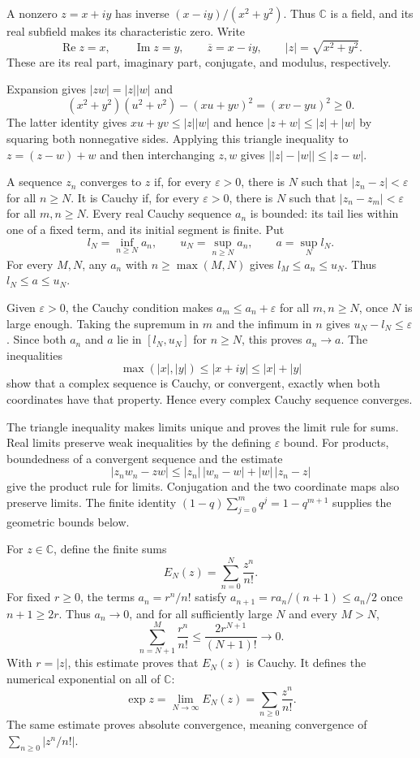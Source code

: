 A nonzero $z=x+iy$ has inverse $(x-iy)/(x^2+y^2)$.
Thus $\mathbb C$ is a field, and its real subfield makes its
characteristic zero.
Write
\[
 \operatorname{Re}z=x,\qquad \operatorname{Im}z=y,\qquad
 \overline z=x-iy,\qquad |z|=\sqrt{x^2+y^2}.
\]
These are its real part, imaginary part, conjugate, and modulus,
respectively.

Expansion gives $|zw|=|z||w|$ and
\[
 (x^2+y^2)(u^2+v^2)-(xu+yv)^2=(xv-yu)^2\geq0.
\]
The latter identity gives $xu+yv\leq|z||w|$ and hence
$|z+w|\leq|z|+|w|$ by squaring both nonnegative sides.
Applying this triangle inequality to $z=(z-w)+w$ and then interchanging
$z,w$ gives $\bigl||z|-|w|\bigr|\leq|z-w|$.

A sequence $z_n$ converges to $z$ if, for every $\varepsilon>0$,
there is $N$ such that $|z_n-z|<\varepsilon$ for all $n\geq N$.
It is Cauchy if, for every $\varepsilon>0$, there is $N$ such that
$|z_n-z_m|<\varepsilon$ for all $m,n\geq N$.
Every real Cauchy sequence $a_n$ is bounded: its tail lies within one
of a fixed term, and its initial segment is finite.
Put
\[
 l_N=\inf_{n\geq N}a_n,\qquad u_N=\sup_{n\geq N}a_n,\qquad
 a=\sup_N l_N.
\]
For every $M,N$, any $a_n$ with $n\geq\max(M,N)$ gives
$l_M\leq a_n\leq u_N$. Thus $l_N\leq a\leq u_N$.

Given $\varepsilon>0$, the Cauchy condition makes
$a_m\leq a_n+\varepsilon$ for all $m,n\geq N$, once $N$ is large enough.
Taking the supremum in $m$ and the infimum in $n$ gives
$u_N-l_N\leq\varepsilon$.
Since both $a_n$ and $a$ lie in $[l_N,u_N]$ for $n\geq N$, this proves
$a_n\to a$.
The inequalities
\[
 \max(|x|,|y|)\leq|x+iy|\leq|x|+|y|
\]
show that a complex sequence is Cauchy, or convergent, exactly when both
coordinates have that property. Hence every complex Cauchy sequence
converges.

The triangle inequality makes limits unique and proves the limit rule
for sums. Real limits preserve weak inequalities by the defining
$\varepsilon$ bound.
For products, boundedness of a convergent sequence and the estimate
\[
 |z_nw_n-zw|
 \leq |z_n|\,|w_n-w|+|w|\,|z_n-z|
\]
give the product rule for limits.
Conjugation and the two coordinate maps also preserve limits.
The finite identity
$(1-q)\sum_{j=0}^m q^j=1-q^{m+1}$ supplies the geometric bounds below.

For $z\in\mathbb C$, define the finite sums
\[
 E_N(z)=\sum_{n=0}^N\frac{z^n}{n!}.
\]
For fixed $r\geq0$, the terms $a_n=r^n/n!$ satisfy
$a_{n+1}=ra_n/(n+1)\leq a_n/2$ once $n+1\geq2r$.
Thus $a_n\to0$, and for all sufficiently large $N$ and every $M>N$,
\[
 \sum_{n=N+1}^M\frac{r^n}{n!}
 \leq\frac{2r^{N+1}}{(N+1)!}\longrightarrow0.
\]
With $r=|z|$, this estimate proves that $E_N(z)$ is Cauchy.
It defines the numerical exponential on all of $\mathbb C$:
\[
 \exp z=\lim_{N\to\infty}E_N(z)
       =\sum_{n\geq0}\frac{z^n}{n!}.
\]
The same estimate proves absolute convergence, meaning convergence of
$\sum_{n\geq0}|z^n/n!|$.


